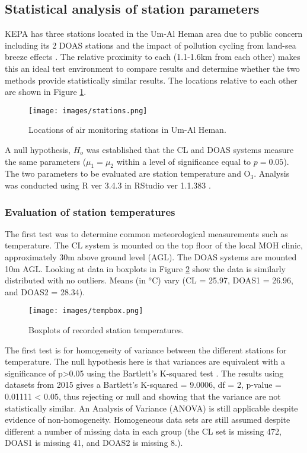 \subsection{Statistical analysis of station parameters}
KEPA has three stations located in the Um-Al Heman area due to public concern including its 2 DOAS stations \citep{Carlisle2010} and the impact of pollution cycling from land-sea breeze effects \cite{Freeman2017}.  The relative proximity to each (1.1-1.6km from each other) makes this an ideal test environment to compare results and determine whether the two methods provide statistically similar results. The locations relative to each other are shown in Figure \ref{fig:stations}.

%
\begin{figure}[H]
\centering
\texttt{[image: images/stations.png]} 
\caption{Locations of air monitoring stations in Um-Al Heman.}
\label{fig:stations}
\end{figure}
%
A null hypothesis, $H_{o}$ was established that the CL and DOAS systems measure the same parameters ($\mu_{1} = \mu_{2}$ within a level of significance equal to $p=0.05$). The two parameters to be evaluated are station temperature and O$_{3}$. Analysis was conducted using R ver 3.4.3 in RStudio ver 1.1.383 \citep{r2013}.

\subsubsection{Evaluation of station temperatures}
 The first test was to determine common meteorological measurements such as temperature.  The CL system is mounted on the top floor of the local MOH clinic, approximately 30m above ground level (AGL). The DOAS systems are mounted 10m AGL. Looking at data in boxplots in Figure \ref{fig:tempbox} show the data is similarly distributed with no outliers. Means (in $^{o}$C)  vary (CL = 25.97, DOAS1 = 26.96, and DOAS2 = 28.34).

%
\begin{figure}[H]
\centering
\texttt{[image: images/tempbox.png]} 
\caption{Boxplots of recorded station temperatures.}
\label{fig:tempbox}
\end{figure}
%

The first test is for homogeneity of variance between the different stations for temperature. The null hypothesis here is that variances are equivalent with a significance of p>0.05 using the Bartlett's K-squared test \citep{Mason2003}. The results using datasets from 2015 gives a Bartlett's K-squared = 9.0006, df = 2, p-value = 0.01111 < 0.05, thus rejecting or null and showing that the variance are not statistically similar. An Analysis of Variance (ANOVA) is still applicable despite evidence of non-homogeneity. Homogeneous data sets are still assumed despite different a number of missing data in each group (the CL set is missing 472, DOAS1 is missing 41, and DOAS2 is missing 8.).

